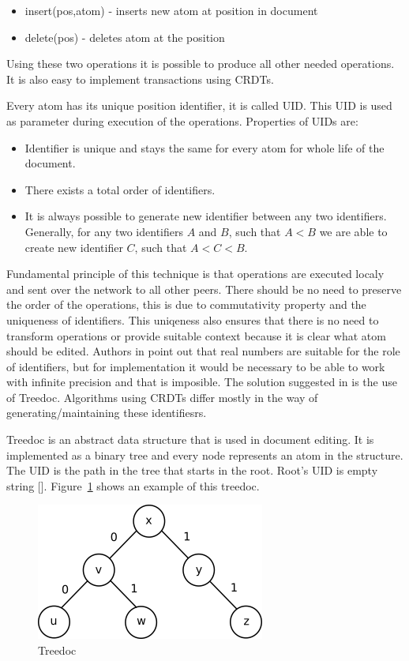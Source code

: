 \documentclass[12pt,oneside]{fithesis2}
\begin{document}
\begin{itemize}
\item insert(pos,atom) - inserts new atom at position in document
\item delete(pos) - deletes atom at the position 
\end{itemize}
Using these two operations it is possible to produce all other needed operations. It is also easy to implement transactions using CRDTs. 
\par Every atom has its unique position identifier, it is called UID. This UID is used as parameter during execution of the operations. Properties of UIDs are:
\begin{itemize}
\item Identifier is unique and stays the same for every atom for whole life of the document.
\item There exists a total order of identifiers.
\item It is always possible to generate new identifier between any two identifiers. Generally, for any two identifiers \(A\) and \(B\), such that \(A < B\) we are able to create new identifier \(C\), such that \(A < C < B\).
\end{itemize}
\par Fundamental principle of this technique is that operations are executed localy and sent over the network to all other peers. There should be no need to preserve the order of the operations, this is due to commutativity property and the uniqueness of identifiers. This uniqeness also ensures that there is no need to transform operations or provide suitable context because it is clear what atom should be edited.
Authors in \cite{Shapiro-design} point out that real numbers are suitable for the role of identifiers, but for implementation it would be necessary to be able to work with infinite precision and that is imposible. The solution suggested in \cite{Shapiro-design} is the use of Treedoc. Algorithms using CRDTs differ mostly in the way of generating/maintaining these identifiesrs.
\par Treedoc is an abstract data structure that is used in document editing. It is implemented as a binary tree and every node represents an atom in the structure. The UID is the path in the tree that starts in the root. Root's UID is empty string []. Figure~\ref{fig:treedoc} shows an example of this treedoc.
\begin{figure}[H]
\caption{Treedoc}
\label{fig:treedoc}
\centering
\vspace{5mm}
\includegraphics{treedoc1} 
\end{figure}
\end{document}
